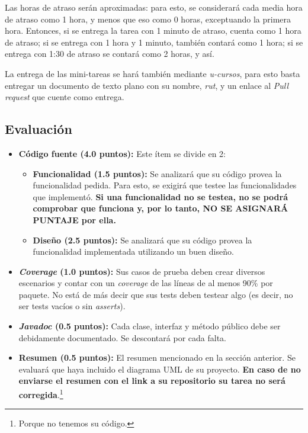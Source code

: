     Las horas de atraso serán aproximadas: para esto, se considerará cada media 
    hora de atraso como 1 hora, y menos que eso como 0 horas, exceptuando la primera hora.
    Entonces, si se entrega la tarea con 1 minuto de atraso, cuenta como 1 hora de atraso;
    si se entrega con 1 hora y 1 minuto, también contará como 1 hora; si se entrega con 
    1:30 de atraso se contará como 2 horas, y así.

    La entrega de las mini-tareas se hará también mediante \textit{u-cursos}, para esto basta 
    entregar un documento de texto plano con su nombre, \textit{rut}, y un enlace al 
    \textit{Pull request} que cuente como entrega. 
  \subsection{Evaluación}
    \begin{itemize}
      \item \textbf{Código fuente (4.0 puntos):} Este ítem se divide en 2:
        \begin{itemize}
          \item \textbf{Funcionalidad (1.5 puntos):} Se analizará que su código provea la 
            funcionalidad pedida.
            Para esto, se exigirá que testee las funcionalidades que 
            implementó\footnotemark.
            \textbf{Si una funcionalidad no se testea, no se podrá comprobar 
            que funciona y, por lo tanto, NO SE ASIGNARÁ PUNTAJE por ella.}
          \item \textbf{Diseño (2.5 puntos):} Se analizará que su código provea la 
            funcionalidad implementada utilizando un buen diseño.
        \end{itemize}
      \item \textbf{\textit{Coverage} (1.0 puntos):} Sus casos de prueba deben crear 
        diversos escenarios y contar con un \textit{coverage} de las líneas de al menos 
        90\% por paquete. 
        No está de más decir que sus tests deben testear algo (es decir, no ser 
        tests vacíos o sin \textit{asserts}).
      \item \textbf{\textit{Javadoc} (0.5 puntos):} Cada clase, interfaz y método público 
        debe ser debidamente documentado. 
        Se descontará por cada falta.
      \item \textbf{Resumen (0.5 puntos):} El resumen mencionado en la sección 
        anterior. 
        Se evaluará que haya incluido el diagrama UML de su proyecto. 
        \textbf{En caso de no enviarse el resumen con el link a su repositorio su 
        tarea no será corregida}.\footnote{Porque no tenemos su código.}
    \end{itemize}
